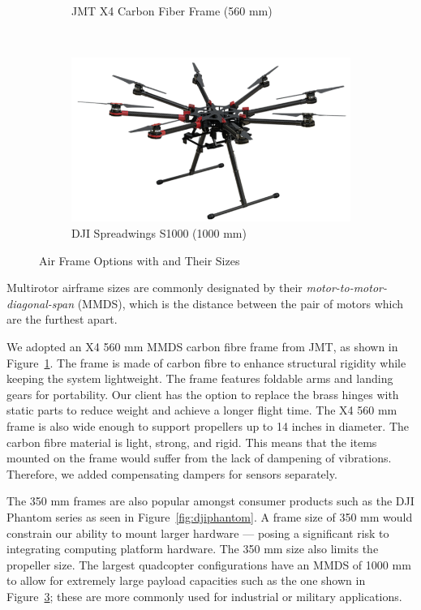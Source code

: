 \begin{figure}[h]
\begin{subfigure}[b]{0.33\textwidth}
		\caption{JMT X4 Carbon Fiber Frame (560 mm)}
		\label{fig:jmtx4}
	\end{subfigure}
	~
	\begin{subfigure}[b]{0.33\textwidth}
		\centering
		\includegraphics[width=\textwidth]{img/djis1000}
		\caption{DJI Spreadwings S1000 (1000 mm)}
		\label{fig:djis1000}
	\end{subfigure}
	
	\caption{Air Frame Options with and Their Sizes }
\end{figure}

Multirotor airframe sizes are commonly designated by their \textit{motor-to-motor-diagonal-span} (MMDS), which is the distance between the pair of motors which are the furthest apart. 

We adopted an X4 560 mm MMDS carbon fibre frame from JMT, as shown in Figure~\ref{fig:jmtx4}. The frame is made of carbon fibre to enhance structural rigidity while keeping the system lightweight. The frame features foldable arms and landing gears for portability. Our client has the option to replace the brass hinges with static parts to reduce weight and achieve a longer flight time. The X4 560 mm frame is also wide enough to support propellers up to 14 inches in diameter. The carbon fibre material is light, strong, and rigid. This means that the items mounted on the frame would suffer from the lack of dampening of vibrations. Therefore, we added compensating dampers for sensors separately.

The 350 mm frames are also popular amongst consumer products such as the DJI Phantom series\cite{dji-phantom-3-specs} as seen in Figure~\ref{fig:djiphantom}. A frame size of 350 mm would constrain our ability to mount larger hardware --- posing a significant risk to integrating computing platform hardware. The 350 mm size also limits the propeller size. The largest quadcopter configurations have an MMDS of 1000 mm to allow for extremely large payload capacities such as the one shown in Figure~\ref{fig:djis1000}; these are more commonly used for industrial or military applications.


